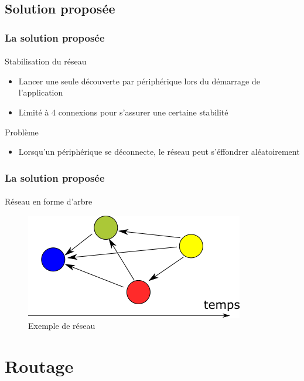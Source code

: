 \documentclass{beamer}
\begin{document}
    \subsection{Solution proposée}
    \begin{frame}
      \frametitle{La solution proposée}
      \framesubtitle{}
      \begin{block}{Stabilisation du réseau}
        \begin{itemize}
          \item Lancer une seule découverte par périphérique lors du démarrage de l'application
          \item Limité à 4 connexions pour s'assurer une certaine stabilité
        \end{itemize}
      \end{block}
      \begin{block}{Problème}
        \begin{itemize}
          \item Lorsqu'un périphérique se déconnecte, le réseau peut s'éffondrer aléatoirement
        \end{itemize}
      \end{block}
    \end{frame}
    \begin{frame}
      \frametitle{La solution proposée}
      \framesubtitle{}
      \begin{block}{Réseau en forme d'arbre}
        \begin{figure}
          \begin{center}
            \includegraphics[width=.5\textwidth]{images/auto.png}
            \caption{Exemple de réseau}
            \label{fig:auto}
          \end{center}
        \end{figure}
      \end{block}
    \end{frame}

  \section{Routage}
  \begin{frame}
    \setcounter{tocdepth}{2}
    \tableofcontents[currentsection]
  \end{frame}
\end{document}
